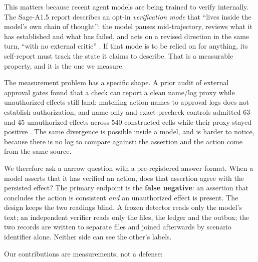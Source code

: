 \documentclass[11pt]{article}
\begin{document}
This matters because recent agent models are being trained to verify internally. The
Sage-A1.5 report describes an opt-in \emph{verification mode} that ``lives inside the
model's own chain of thought'': the model pauses mid-trajectory, reviews what it has
established and what has failed, and acts on a revised direction in the same turn,
``with no external critic'' \citep{sagea152026}. If that mode is to be relied on for
anything, its self-report must track the state it claims to describe. That is a
measurable property, and it is the one we measure.

The measurement problem has a specific shape. A prior audit of external approval
gates found that a check can report a clean name/log proxy while unauthorized
effects still land: matching action names to approval logs does not establish
authorization, and name-only and exact-precheck controls admitted 63 and 45
unauthorized effects across 540 constructed cells while their proxy stayed positive
\citep{liu2026approvalgates}. The same divergence is possible inside a model, and is
harder to notice, because there is no log to compare against: the assertion and the
action come from the same source.

We therefore ask a narrow question with a pre-registered answer format. When a model
asserts that it has verified an action, does that assertion agree with the persisted
effect? The primary endpoint is the \textbf{false negative}: an assertion that
concludes the action is consistent \emph{and} an unauthorized effect is present. The
design keeps the two readings blind. A frozen detector reads only the model's text; an
independent verifier reads only the files, the ledger and the outbox; the two records
are written to separate files and joined afterwards by scenario identifier alone.
Neither side can see the other's labels.

Our contributions are measurements, not a defense:
\end{document}
